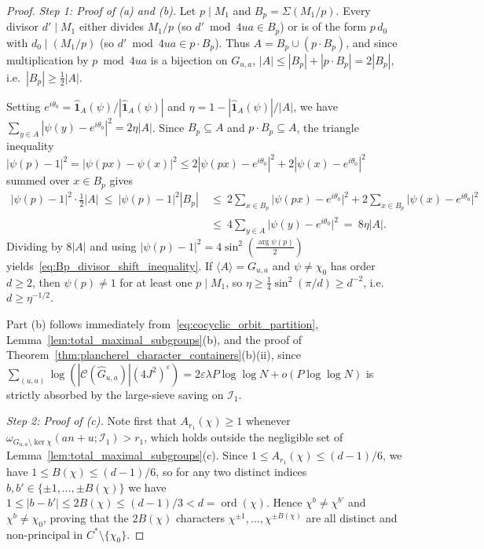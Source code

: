 \documentclass[11pt, a4paper]{article}
\theoremstyle{plain}
\theoremstyle{definition}
\begin{document}
\begin{proof}
\emph{Step 1: Proof of (a) and (b).}
Let $p\mid M_1$ and $B_p=\Sigma(M_1/p)$. Every divisor $d'\mid M_1$ either divides $M_1/p$ (so $d'\bmod 4ua\in B_p$) or is of the form $p\,d_0$ with $d_0\mid(M_1/p)$ (so $d'\bmod 4ua\in p\cdot B_p$). Thus $A=B_p\cup(p\cdot B_p)$, and since multiplication by $p\bmod 4ua$ is a bijection on $G_{u,a}$, $|A|\le|B_p|+|p\cdot B_p|=2|B_p|$, i.e.\ $|B_p|\ge\frac12|A|$. 

Setting $e^{i\theta_0}=\widehat{\mathbf{1}}_A(\psi)/|\widehat{\mathbf{1}}_A(\psi)|$ and $\eta=1-|\widehat{\mathbf{1}}_A(\psi)|/|A|$, we have $\sum_{y\in A}|\psi(y)-e^{i\theta_0}|^{2}=2\eta|A|$. Since $B_p\subseteq A$ and $p\cdot B_p\subseteq A$, the triangle inequality $|\psi(p)-1|^{2}=|\psi(px)-\psi(x)|^{2}\le 2|\psi(px)-e^{i\theta_0}|^{2}+2|\psi(x)-e^{i\theta_0}|^{2}$ summed over $x\in B_p$ gives
\[
\begin{aligned}
\big|\psi(p)-1\big|^{2}\cdot\frac12|A|\ \le\ \big|\psi(p)-1\big|^{2}|B_p|\ &\le\ 2\sum_{x\in B_p}\big|\psi(px)-e^{i\theta_0}\big|^{2}+2\sum_{x\in B_p}\big|\psi(x)-e^{i\theta_0}\big|^{2} \\
&\le\ 4\sum_{y\in A}\big|\psi(y)-e^{i\theta_0}\big|^{2}\ =\ 8\eta|A|.
\end{aligned}
\]
Dividing by $8|A|$ and using $|\psi(p)-1|^{2}=4\sin^{2}(\frac{\arg\psi(p)}{2})$ yields~\eqref{eq:Bp_divisor_shift_inequality}. If $\langle A\rangle=G_{u,a}$ and $\psi\neq\chi_0$ has order $d\ge2$, then $\psi(p)\neq1$ for at least one $p\mid M_1$, so $\eta\ge\frac14\sin^{2}(\pi/d)\ge d^{-2}$, i.e.\ $d\ge\eta^{-1/2}$. 

Part (b) follows immediately from~\eqref{eq:cocyclic_orbit_partition}, Lemma~\ref{lem:total_maximal_subgroups}(b), and the proof of Theorem~\ref{thm:plancherel_character_containers}(b)(ii), since $\sum_{(u,a)}\log(|\mathcal{C}(\widehat{G}_{u,a})|(4J^{2})^{\varepsilon})=2\varepsilon\lambda P\log\log N+o(P\log\log N)$ is strictly absorbed by the large-sieve saving on $\mathcal{I}_1$.

\medskip\noindent\emph{Step 2: Proof of (c).}
Note first that $A_{r_1}(\chi)\ge1$ whenever $\omega_{G_{u,a}\setminus\ker\chi}(an+u;\mathcal{I}_1)>r_1$, which holds outside the negligible set of Lemma~\ref{lem:total_maximal_subgroups}(c). Since $1\le A_{r_1}(\chi)\le(d-1)/6$, we have $1\le B(\chi)\le(d-1)/6$, so for any two distinct indices $b,b'\in\{\pm1,\dots,\pm B(\chi)\}$ we have $1\le|b-b'|\le 2B(\chi)\le(d-1)/3<d=\operatorname{ord}(\chi)$. Hence $\chi^{b}\neq\chi^{b'}$ and $\chi^{b}\neq\chi_0$, proving that the $2B(\chi)$ characters $\chi^{\pm1},\dots,\chi^{\pm B(\chi)}$ are all distinct and non-principal in $C^{\ast}\setminus\{\chi_0\}$. 


\end{proof}
\end{document}
